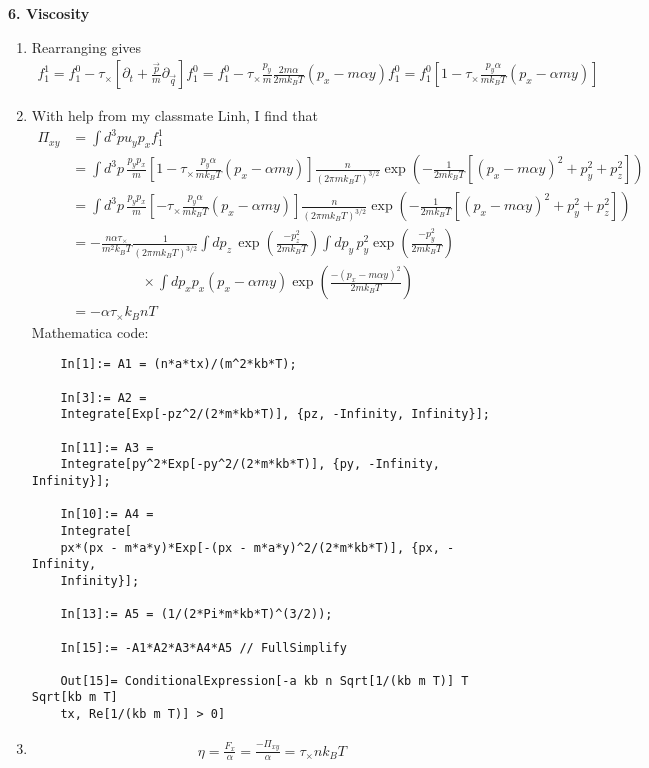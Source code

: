 \documentclass{article}
\theoremstyle{definition}
\newcommand{\p}{\partial}
\newcommand{\al}{\alpha}
\newcommand{\f}[2]{\frac{#1}{#2}}
\newcommand{\lp}{\left(}
\newcommand{\rp}{\right)}
\newcommand{\lb}{\left[}
\newcommand{\rb}{\right]}
\begin{document}
\noindent \textbf{6. Viscosity}

\begin{enumerate}[label=(\alph*)]
	\item Rearranging gives
	\begin{align*}
	\boxed{f_1^1} = f_1^0 - \tau_\times \lb \p_t + \f{\vec{p}}{m} \p_{\vec{q}} \rb f_1^0 = f_1^0 - \tau_\times \f{p_y}{m} \f{2m\al}{2mk_B T}(p_x - m\al y) f_1^0 = \boxed{f_1^0\lb 1 - \tau_\times \f{p_y \al}{ mk_B T}(p_x - \al m y) \rb}
	\end{align*}
	
	\item With help from my classmate Linh, I find that
	\begin{align*}
	\boxed{\Pi_{xy}} 
	&= \int d^3 p u_y p_x f_1^1 \\
	&= \int d^3 p \, \f{p_yp_x}{m} \lb 1 - \tau_\times \f{p_y \al}{ mk_B T}(p_x - \al m y) \rb \f{n}{(2\pi m k_B T)^{3/2}} \exp\lp -\f{1}{2mk_BT }\lb (p_x - m\al y)^2 + p_y^2 + p_z^2 \rb \rp \\
	&= \int d^3 p \, \f{p_yp_x}{m} \lb- \tau_\times \f{p_y \al}{ mk_B T}(p_x - \al m y) \rb \f{n}{(2\pi m k_B T)^{3/2}} \exp\lp -\f{1}{2mk_BT }\lb (p_x - m\al y)^2 + p_y^2 + p_z^2 \rb \rp \\
	&= -\f{n\al \tau_\times }{m^2 k_BT}\f{1}{(2\pi m k_B T)^{3/2}}\int dp_z\,\exp\lp \f{-p_z^2}{2mk_BT} \rp 
	\int d p_y \,p_y^2 \exp\lp \f{-p_y^2}{2mk_BT}\rp \\
	&\quad\quad\quad\quad\quad \times \int d p_x p_x(p_x - \al m y)\exp\lp \f{-(p_x-m\al y)^2}{2mk_BT}\rp \\
	&= \boxed{-\al \tau_\times k_B n T}
	\end{align*}
	Mathematica code:
	\begin{lstlisting}
	In[1]:= A1 = (n*a*tx)/(m^2*kb*T);
	
	In[3]:= A2 = 
	Integrate[Exp[-pz^2/(2*m*kb*T)], {pz, -Infinity, Infinity}];
	
	In[11]:= A3 = 
	Integrate[py^2*Exp[-py^2/(2*m*kb*T)], {py, -Infinity, Infinity}];
	
	In[10]:= A4 = 
	Integrate[
	px*(px - m*a*y)*Exp[-(px - m*a*y)^2/(2*m*kb*T)], {px, -Infinity, 
	Infinity}];
	
	In[13]:= A5 = (1/(2*Pi*m*kb*T)^(3/2));
	
	In[15]:= -A1*A2*A3*A4*A5 // FullSimplify
	
	Out[15]= ConditionalExpression[-a kb n Sqrt[1/(kb m T)] T Sqrt[kb m T]
	tx, Re[1/(kb m T)] > 0]
	\end{lstlisting}
	
	
	\item 
	\begin{align*}
	\boxed{\eta = \f{F_x}{\al} = \f{-\Pi_{xy}}{\al} = \tau_\times n k_B T}
	\end{align*}
\end{enumerate}
\end{document}
